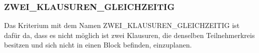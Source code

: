 \subsubsection{ZWEI\_KLAUSUREN\_GLEICHZEITIG}
Das Kriterium mit dem Namen ZWEI\_KLAUSUREN\_GLEICHZEITIG ist dafür da, dass es nicht
möglich ist zwei Klausuren, die denselben Teilnehmerkreis besitzen und sich nicht in einen
Block befinden, einzuplanen.